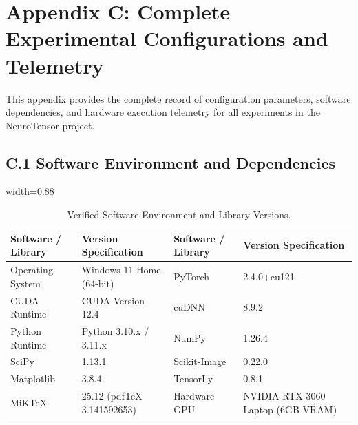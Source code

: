 \section*{Appendix C: Complete Experimental Configurations and Telemetry}
\label{app:configs}

This appendix provides the complete record of configuration parameters, software dependencies, and hardware execution telemetry for all experiments in the NeuroTensor project.

\subsection*{C.1 Software Environment and Dependencies}
\begin{table}[htbp]
\centering
\caption{Verified Software Environment and Library Versions.}
\label{tab:software_env}
\begin{adjustbox}{width=0.88\textwidth}
\begin{tabular}{ll|ll}
\toprule
\textbf{Software / Library} & \textbf{Version Specification} & \textbf{Software / Library} & \textbf{Version Specification} \\
\midrule
Operating System & Windows 11 Home (64-bit) & PyTorch & 2.4.0+cu121 \\
CUDA Runtime & CUDA Version 12.4 & cuDNN & 8.9.2 \\
Python Runtime & Python 3.10.x / 3.11.x & NumPy & 1.26.4 \\
SciPy & 1.13.1 & Scikit-Image & 0.22.0 \\
Matplotlib & 3.8.4 & TensorLy & 0.8.1 \\
MiKTeX & 25.12 (pdfTeX 3.141592653) & Hardware GPU & NVIDIA RTX 3060 Laptop (6GB VRAM) \\
\bottomrule
\end{tabular}
\end{adjustbox}
\end{table}

